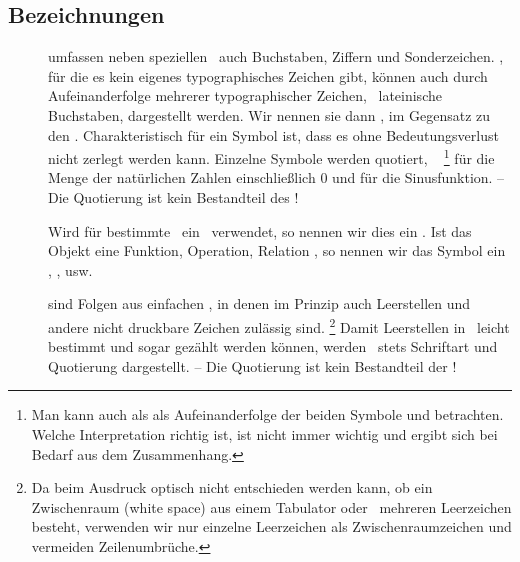 \subsection{Bezeichnungen}%
\label{sub-Bezeichnungen}

\begin{description}

	\item [\Symbole] umfassen neben speziellen \Symbolen\ auch Buchstaben, Ziffern und Sonderzeichen.
	\Symbole, für die es kein eigenes typographisches Zeichen gibt, können auch durch Aufeinanderfolge mehrerer typographischer Zeichen, \textiAlg\ lateinische Buchstaben, dargestellt werden.
	Wir nennen sie dann , im Gegensatz zu den .
	Charakteristisch für ein Symbol ist, dass es ohne Bedeutungsverlust nicht zerlegt werden kann.
	Einzelne Symbole werden  quotiert, \textzB\ \chrqt{$\INo$}%
	\footnote{%
		Man kann \chrqt{$\INo$} auch als als Aufeinanderfolge der beiden Symbole \chrqt{$\IN$} und  betrachten.
		Welche Interpretation richtig ist, ist nicht immer wichtig und ergibt sich bei Bedarf aus dem Zusammenhang.
	}
	für die Menge der natürlichen Zahlen einschließlich 0 und \chrqt{$\sin$} für die Sinusfunktion.
	-- Die Quotierung ist kein Bestandteil des \Symbols!

	Wird für bestimmte \Objekte\ ein \Symbol\ verwendet, so nennen wir dies ein .
	Ist das Objekt eine Funktion, Operation, Relation \textusw, so nennen wir das Symbol ein , ,  usw.

	\item [\Zeichenketten] sind Folgen aus einfachen \Symbolen, in denen im Prinzip auch Leerstellen und andere nicht druckbare Zeichen zulässig sind.%
	\footnote{%
		Da beim Ausdruck optisch nicht entschieden werden kann, ob ein Zwischenraum (white space) aus einem Tabulator oder \textevtl\ mehreren Leerzeichen besteht, verwenden wir nur einzelne Leerzeichen als Zwischenraumzeichen und vermeiden Zeilenumbrüche.
	}
	Damit Leerstellen in \Zeichenketten\ leicht bestimmt und sogar gezählt werden können,
	werden \Zeichenketten\ stets  Schriftart und Quotierung dargestellt.
	-- Die Quotierung ist kein Bestandteil der \Zeichenkette!


\end{description}
